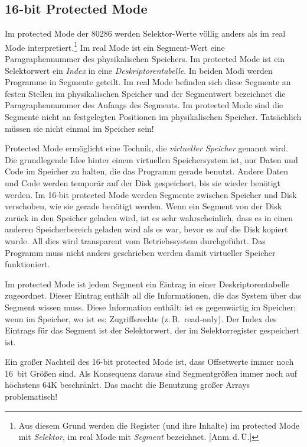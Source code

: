 \subsection{16-bit Protected Mode \label{sec:16prot_mode} }

Im protected Mode der 80286 werden Selektor-Werte v\"{o}llig anders als
im real Mode interpretiert.\footnote{Aus diesem Grund werden die
Register (und ihre Inhalte) im protected Mode mit \emph{Selektor},
im real Mode mit \emph{Segment} bezeichnet. [Anm.\,d.\,\"{U}\@.]} Im
real Mode ist ein Segment-Wert eine Paragraphennummer des
physikalischen Speichers. Im protected Mode ist ein Selektorwert ein
\emph{Index} in eine \emph{Deskriptorentabelle}. In beiden Modi
werden Programme in Segmente  geteilt. Im
real Mode befinden sich diese Segmente an festen Stellen im
physikalischen Speicher und der Segmentwert bezeichnet die
Paragraphennummer des Anfangs des Segments. Im protected Mode sind
die Segmente nicht an festgelegten Positionen im physikalischen
Speicher. Tats\"{a}chlich m\"{u}ssen sie nicht einmal im Speicher sein!

Protected Mode erm\"{o}glicht eine Technik, die \emph{virtueller
Speicher}  genannt wird. Die grundlegende
Idee hinter einem virtuellen Speichersystem ist, nur Daten und Code
im Speicher zu halten, die das Programm gerade benutzt. Andere Daten
und Code werden tempor\"{a}r auf der Disk gespeichert, bis sie wieder
ben\"{o}tigt werden. Im 16-bit protected Mode werden Segmente zwischen
Speicher und Disk verschoben, wie sie gerade ben\"{o}tigt werden. Wenn
ein Segment von der Disk zur\"{u}ck in den Speicher geladen wird, ist es
sehr wahrscheinlich, dass es in einen anderen Speicherbereich
geladen wird als es war, bevor es auf die Disk kopiert wurde. All
dies wird transparent vom Betriebssystem durchgef\"{u}hrt. Das Programm
muss nicht anders geschrieben werden damit virtueller Speicher
funktioniert.

Im protected Mode ist jedem Segment ein Eintrag in einer
Deskriptorentabelle zugeordnet. Dieser Eintrag enth\"{a}lt all die
Informationen, die das System \"{u}ber das Segment wissen muss. Diese
Information enth\"{a}lt: ist es gegenw\"{a}rtig im Speicher; wenn im
Speicher, wo ist es; Zugriffsrechte (z.\,B.\ read-only). Der Index
des Eintrags f\"{u}r das Segment ist der Selektorwert, der im
Selektorregister gespeichert ist.

Ein  gro{\ss}er Nachteil des 16-bit protected Mode
ist, dass Offsetwerte immer noch 16~bit Gr\"{o}{\ss}en sind. Als Konsequenz
daraus sind Segmentgr\"{o}{\ss}en immer noch auf h\"{o}chstens 64K beschr\"{a}nkt.
Das macht die Benutzung gro{\ss}er Arrays problematisch!

